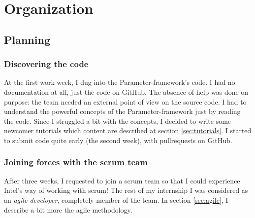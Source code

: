 \chapter{Organization}\label{chap:organisation}

\section{Planning}
\subsection{Discovering the code}
At the first work week, I dug into the Parameter-framework's code. I had no
documentation at all, just the code on GitHub. The absence of help was done on
purpose: the team needed an external point of view on the source code. I had
to understand the powerful concepts of the Parameter-framework just by reading
the code. Since I struggled a bit with the concepts, I decided to write some
newcomer tutorials which content are described at section \ref{sec:tutorials}.
I started to submit code quite early (the second week), with \gls{pullrequests} on GitHub.

\subsection{Joining forces with the scrum team}
After three weeks, I requested to join a \gls{scrum} team so that I could experience
Intel's way of working with \gls{scrum}!
The rest of my internship I was considered as an \emph{agile developer}, completely member of the team.
In section \ref{sec:agile}, I describe a bit more the agile methodology.

